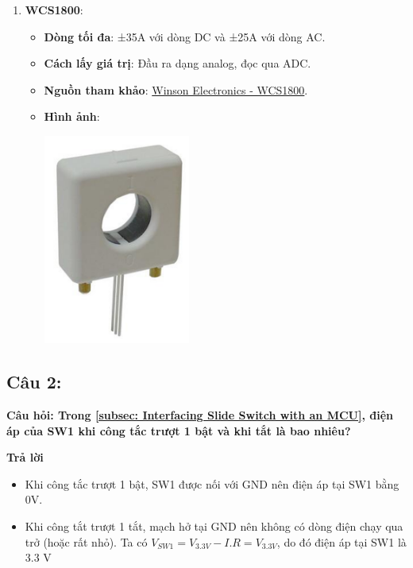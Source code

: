 \begin{enumerate}
    \item \textbf{WCS1800}:
    \begin{itemize}
        \item \textbf{Dòng tối đa}: ±35A với dòng DC và ±25A với dòng AC.
        \item \textbf{Cách lấy giá trị}: Đầu ra dạng analog, đọc qua ADC.
        \item \textbf{Nguồn tham khảo}: \href{https://www.winson.com.tw/uploads/images/WCS1800.pdf}{Winson Electronics - WCS1800}.
        \item \textbf{Hình ảnh}:
        \begin{center}
            \includegraphics[width=0.4\textwidth]{graphics/section5/wcs1800.png}
        \end{center}
    \end{itemize}

\end{enumerate}

\subsection{Câu 2:}
\textbf{Câu hỏi: Trong \ref{subsec: Interfacing Slide Switch with an MCU}, điện áp của SW1 khi công tắc trượt 1 bật và khi tắt là bao nhiêu?}

\textbf{Trả lời}
\begin{itemize}
    \item Khi công tắc trượt 1 bật, SW1 được nối với GND nên điện áp tại SW1 bằng 0V.
    \item Khi công tắt trượt 1 tắt, mạch hở tại GND nên không có dòng điện chạy qua trở (hoặc rất nhỏ). Ta có $V_{SW1} = V_{3.3V} - I.R = V_{3.3V}$, do đó điện áp tại SW1 là 3.3 V 
\end{itemize}

